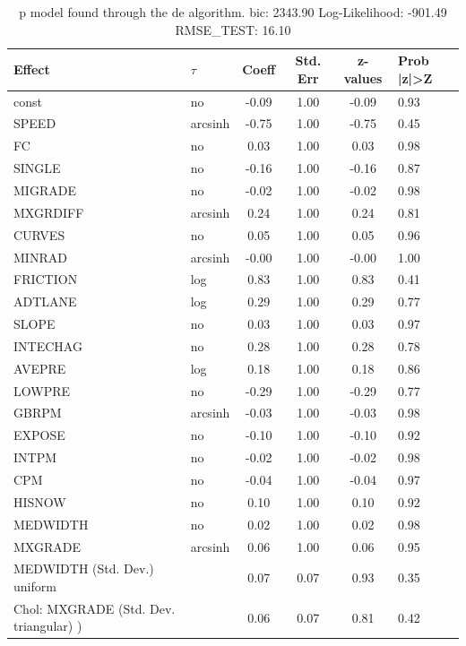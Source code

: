 \begin{table}
	\caption{p model found through the de algorithm. bic: 2343.90 Log-Likelihood: -901.49 RMSE_TEST: 16.10}
	\begin{center}
		\begin{tabular}{|l|l|c|c|c|l|}
			\hline
			Effect & $\tau$ & Coeff & Std. Err & z-values & Prob |z|>Z \\
			\hline
			const & no & -0.09 & 1.00 & -0.09 & 0.93 \\
			\hline
			SPEED & arcsinh & -0.75 & 1.00 & -0.75 & 0.45 \\
			\hline
			FC & no & 0.03 & 1.00 & 0.03 & 0.98 \\
			\hline
			SINGLE & no & -0.16 & 1.00 & -0.16 & 0.87 \\
			\hline
			MIGRADE & no & -0.02 & 1.00 & -0.02 & 0.98 \\
			\hline
			MXGRDIFF & arcsinh & 0.24 & 1.00 & 0.24 & 0.81 \\
			\hline
			CURVES & no & 0.05 & 1.00 & 0.05 & 0.96 \\
			\hline
			MINRAD & arcsinh & -0.00 & 1.00 & -0.00 & 1.00 \\
			\hline
			FRICTION & log & 0.83 & 1.00 & 0.83 & 0.41 \\
			\hline
			ADTLANE & log & 0.29 & 1.00 & 0.29 & 0.77 \\
			\hline
			SLOPE & no & 0.03 & 1.00 & 0.03 & 0.97 \\
			\hline
			INTECHAG & no & 0.28 & 1.00 & 0.28 & 0.78 \\
			\hline
			AVEPRE & log & 0.18 & 1.00 & 0.18 & 0.86 \\
			\hline
			LOWPRE & no & -0.29 & 1.00 & -0.29 & 0.77 \\
			\hline
			GBRPM & arcsinh & -0.03 & 1.00 & -0.03 & 0.98 \\
			\hline
			EXPOSE & no & -0.10 & 1.00 & -0.10 & 0.92 \\
			\hline
			INTPM & no & -0.02 & 1.00 & -0.02 & 0.98 \\
			\hline
			CPM & no & -0.04 & 1.00 & -0.04 & 0.97 \\
			\hline
			HISNOW & no & 0.10 & 1.00 & 0.10 & 0.92 \\
			\hline
			MEDWIDTH & no & 0.02 & 1.00 & 0.02 & 0.98 \\
			\hline
			MXGRADE & arcsinh & 0.06 & 1.00 & 0.06 & 0.95 \\
			\hline
			MEDWIDTH (Std. Dev.) uniform &  & 0.07 & 0.07 & 0.93 & 0.35 \\
			\hline
			 Chol: MXGRADE (Std. Dev. triangular) ) &  & 0.06 & 0.07 & 0.81 & 0.42 \\
			\hline
		\end{tabular}
	\end{center}
\end{table}